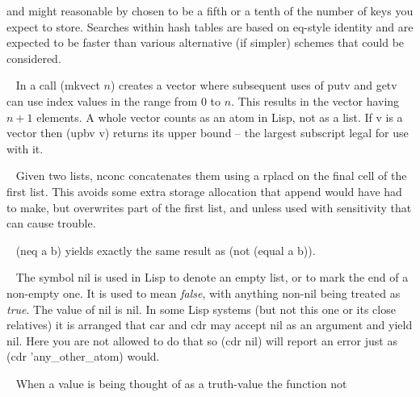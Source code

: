 \begin{description}
and might reasonable by chosen to be a fifth or a tenth of the number
of keys you expect to store. Searches within hash tables are based on
{\tx eq}-style identity and are expected to be faster than various
alternative (if simpler) schemes that could be considered.
\item[{\tx mkvect~~~~~~~} \hspace{1cm} {\em function 1 arg}]~\newline
In \vsl{} a call {\tx (mkvect $n$)} creates a vector where subsequent uses
of {\tx putv} and {\tx getv} can use index values in the range from $0$
to $n$. This results in the vector having $n+1$ elements. A whole vector
counts as an atom in Lisp, not as a list.  If {\tx v} is a vector then
{\tx (upbv v)} returns its upper bound -- the largest subscript legal for
use with it.
\item[{\tx nconc~~~~~~~~} \hspace{1cm} {\em function 2 args}]~\newline
Given two lists, {\tx nconc} concatenates them using a {\tx rplacd} on the
final cell of the first list. This avoids some extra storage allocation that
{\tx append} would have had to make, but overwrites part of the
first list, and unless used with sensitivity that can cause trouble.
\item[{\tx neq~~~~~~~~~~} \hspace{1cm} {\em function 2 args}]~\newline
{\tx (neq a b)} yields exactly the same result as {\tx (not (equal a b))}.
\item[{\tx nil~~~~~~~~~~} \hspace{1cm} {\em predefined variable}]~\newline
The symbol {\tx nil} is used in Lisp to denote an empty list, or to mark
the end of a non-empty one. It is used to mean {\em false}, with anything
non-nil being treated as {\em true}. The value of {\tx nil} is {\tx nil}. In
some Lisp systems (but not this one or its close relatives) it is arranged
that {\tx car} and {\tx cdr} may accept {\tx nil} as an argument and yield
{\tx nil}. Here you are not allowed to do that so {\tx (cdr nil)} will
report an error just as {\tx (cdr 'any\_other\_atom)} would.
\item[{\tx not~~~~~~~~~~} \hspace{1cm} {\em function 1 arg}]~\newline
When a value is being thought of as a truth-value the function {\tx not}

\end{description}
